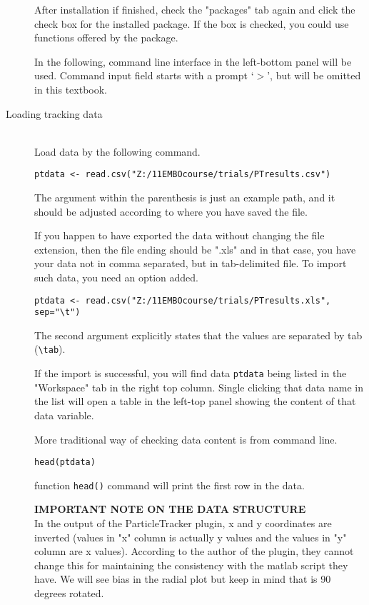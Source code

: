 \documentclass[11pnt]{article}
\begin{document}
\begin{description}
After installation if finished, check the "packages" tab again and click the check box for the installed package. If the box is checked, you could use functions offered by the package.

In the following, command line interface in the left-bottom panel will be used. Command input field starts with a prompt `$>$', but will be omitted in this textbook.

\item[Loading tracking data]\hfill\\

Load data by the following command. 

\begin{verbatim}
ptdata <- read.csv("Z:/11EMBOcourse/trials/PTresults.csv")
\end{verbatim}

The argument within the parenthesis is just an example path, and it should be adjusted according to where you have saved the file. 

If you happen to have exported the data without changing the file extension, then the file ending should be ".xls" and in that case, you have your data not in comma separated, but in tab-delimited file. To import such data, you need an option added. 

\begin{verbatim}
ptdata <- read.csv("Z:/11EMBOcourse/trials/PTresults.xls", sep="\t")
\end{verbatim}

The second argument explicitly states that the values are separated by tab (\verb"\tab"). 

If the import is successful, you will find data \verb"ptdata" being listed in the "Workspace" tab in the right top column. Single clicking that data name in the list will open a table in the left-top panel showing the content of that data variable. 

More traditional way of checking data content is from command line. 

\begin{verbatim}
head(ptdata)
\end{verbatim}

function \verb"head()" command will print the first row in the data. 

\textbf{IMPORTANT NOTE ON THE DATA STRUCTURE}\\
In the output of the ParticleTracker plugin, x and y coordinates are inverted (values in "x" column is actually y values and the values in "y" column are x values). According to the author of the plugin, they cannot change this for maintaining the consistency with the matlab script they have. We will see bias in the radial plot but keep in mind that is 90 degrees rotated.  


\end{description}
\end{document}
